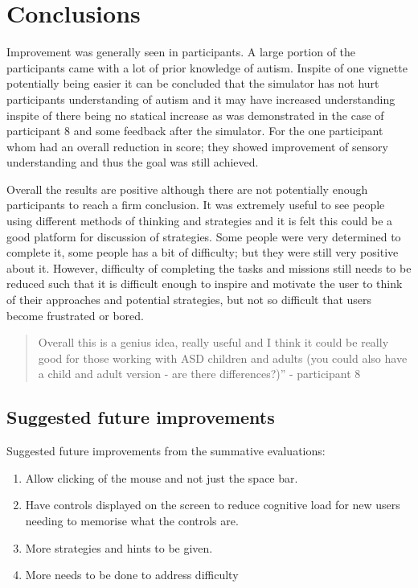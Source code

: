 \documentclass[11pt]{report}
\begin{document}
\section{Conclusions}
Improvement was generally seen in participants. A large portion of the participants came with a lot of prior knowledge of autism. Inspite of one vignette potentially being easier it can be concluded that the simulator has not hurt participants understanding of autism and it may have increased understanding inspite of there being no statical increase as was demonstrated in the case of participant 8 and some feedback after the simulator. For the one participant whom had an overall reduction in score; they showed improvement of sensory understanding and thus the goal was still achieved. 

Overall the results are positive although there are not potentially enough participants to reach a firm conclusion. It was extremely useful to see people using different methods of thinking and strategies and it is felt this could be a good platform for discussion of strategies. Some people were very determined to complete it, some people has a bit of difficulty; but they were still very positive about it. However, difficulty of completing the tasks and missions still needs to be reduced such that it is difficult enough to inspire and motivate the user to think of their approaches and potential strategies, but not so difficult that users become frustrated or bored. 

\begin{quote}
Overall this is a genius idea, really useful and I think it could be really good for those working with ASD children and adults (you could also have a child and adult version - are there differences?)” - participant 8
\end{quote}

\subsection{Suggested future improvements}
Suggested future improvements from the summative evaluations:
\begin{enumerate}
\item Allow clicking of the mouse and not just the space bar.
\item Have controls displayed on the screen to reduce cognitive load for new users needing to memorise what the controls are. 
\item More strategies and hints to be given. 
\item More needs to be done to address difficulty
\end{enumerate}
\end{document}
